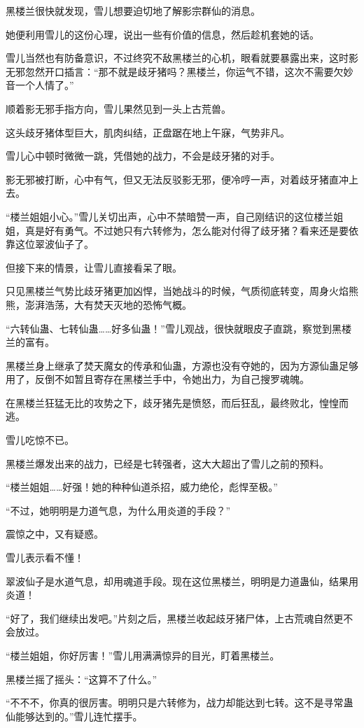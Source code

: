 \begin{this_body}
黑楼兰很快就发现，雪儿想要迫切地了解影宗群仙的消息。

她便利用雪儿的这份心理，说出一些有价值的信息，然后趁机套她的话。

雪儿当然也有防备意识，不过终究不敌黑楼兰的心机，眼看就要暴露出来，这时影无邪忽然开口插言：“那不就是歧牙猪吗？黑楼兰，你运气不错，这次不需要欠妙音一个人情了。”

顺着影无邪手指方向，雪儿果然见到一头上古荒兽。

这头歧牙猪体型巨大，肌肉纠结，正盘踞在地上午寐，气势非凡。

雪儿心中顿时微微一跳，凭借她的战力，不会是歧牙猪的对手。

影无邪被打断，心中有气，但又无法反驳影无邪，便冷哼一声，对着歧牙猪直冲上去。

“楼兰姐姐小心。”雪儿关切出声，心中不禁暗赞一声，自己刚结识的这位楼兰姐姐，真是好有勇气。不过她只有六转修为，怎么能对付得了歧牙猪？看来还是要依靠这位翠波仙子了。

但接下来的情景，让雪儿直接看呆了眼。

只见黑楼兰气势比歧牙猪更加凶悍，当她战斗的时候，气质彻底转变，周身火焰熊熊，澎湃浩荡，大有焚天灭地的恐怖气概。

“六转仙蛊、七转仙蛊……好多仙蛊！”雪儿观战，很快就眼皮子直跳，察觉到黑楼兰的富有。

黑楼兰身上继承了焚天魔女的传承和仙蛊，方源也没有夺她的，因为方源仙蛊足够用了，反倒不如暂且寄存在黑楼兰手中，令她出力，为自己搜罗魂魄。

在黑楼兰狂猛无比的攻势之下，歧牙猪先是愤怒，而后狂乱，最终败北，惶惶而逃。

雪儿吃惊不已。

黑楼兰爆发出来的战力，已经是七转强者，这大大超出了雪儿之前的预料。

“楼兰姐姐……好强！她的种种仙道杀招，威力绝伦，彪悍至极。”

“不过，她明明是力道气息，为什么用炎道的手段？”

震惊之中，又有疑惑。

雪儿表示看不懂！

翠波仙子是水道气息，却用魂道手段。现在这位黑楼兰，明明是力道蛊仙，结果用炎道！

“好了，我们继续出发吧。”片刻之后，黑楼兰收起歧牙猪尸体，上古荒魂自然更不会放过。

“楼兰姐姐，你好厉害！”雪儿用满满惊异的目光，盯着黑楼兰。

黑楼兰摇了摇头：“这算不了什么。”

“不不不，你真的很厉害。明明只是六转修为，战力却能达到七转。这不是寻常蛊仙能够达到的。”雪儿连忙摆手。


\end{this_body}
